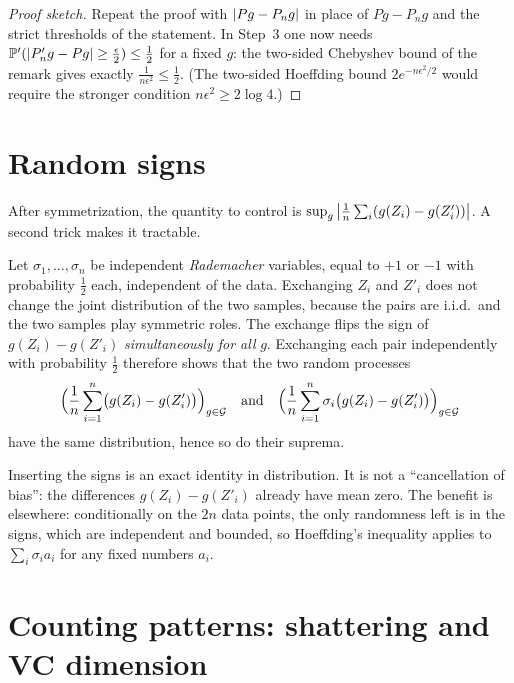 \begin{notechapter}
\begin{proof}[Proof sketch]
Repeat the proof with $\left|Pg - P_n g\right|$ in place of $Pg - P_ng$ and the strict
thresholds of the statement. In Step~3 one now needs
$\mathbb{P}'(\left|P'_n g - Pg\right| \geq \frac\epsilon2) \leq \frac12$ for a fixed $g$:
the two-sided Chebyshev bound of the remark gives exactly $\frac1{n\epsilon^2}\leq\frac12$.
(The two-sided Hoeffding bound $2e^{-n\epsilon^2/2}$ would require the
stronger condition $n\epsilon^2\geq 2\log 4$.)
\end{proof}

\section{Random signs}\label{symmetrization-lemma:sec:rademacher}

After symmetrization, the quantity to control is
$\sup_g \left|\frac1n\sum_i (g(Z_i) - g(Z'_i))\right|$. A second trick makes it
tractable.

Let $\sigma_1,\dots,\sigma_n$ be independent \emph{Rademacher} variables,
equal to $+1$ or $-1$ with probability $\frac12$ each, independent of the
data. Exchanging $Z_i$ and $Z'_i$ does not change the joint distribution of the
two samples, because the pairs are i.i.d.\ and the two samples play symmetric
roles. The exchange flips the sign of $g(Z_i) - g(Z'_i)$ \emph{simultaneously
for all} $g$. Exchanging each pair independently with probability $\frac12$
therefore shows that the two random processes
\[
  \Bigl(\frac1n\sum_{i=1}^n \bigl(g(Z_i) - g(Z'_i)\bigr)\Bigr)_{g\in\mathcal G}
  \quad\text{and}\quad
  \Bigl(\frac1n\sum_{i=1}^n \sigma_i\bigl(g(Z_i) - g(Z'_i)\bigr)\Bigr)_{g\in\mathcal G}
\]
have the same distribution, hence so do their suprema.

\begin{pitfall}
Inserting the signs is an exact identity in distribution. It is not a
``cancellation of bias'': the differences $g(Z_i) - g(Z'_i)$ already have mean
zero. The benefit is elsewhere: conditionally on the $2n$ data points, the only
randomness left is in the signs, which are independent and bounded, so
Hoeffding's inequality applies to $\sum_i\sigma_i a_i$ for any fixed numbers
$a_i$.
\end{pitfall}

\section{Counting patterns: shattering and VC dimension}\label{symmetrization-lemma:sec:vc}


\end{notechapter}
